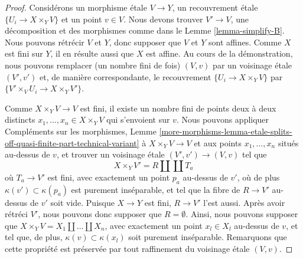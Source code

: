 \begin{proof}
Consid\'erons un morphisme \'etale $V \to Y$, un recouvrement \'etale $\{U_i \to X \times_Y V\}$ et
un point $v \in V$. Nous devons trouver $V' \to V$, une d\'ecomposition et des morphismes comme dans le
Lemme \ref{lemma-simplify-B}.
Nous pouvons r\'etr\'ecir $V$ et $Y$, donc supposer que $V$ et $Y$ sont affines.
Comme $X$ est fini sur $Y$, il en r\'esulte aussi que $X$ est affine.
Au cours de la d\'emonstration, nous pouvons remplacer (un nombre fini de fois) $(V, v)$ par un
voisinage \'etale $(V', v')$ et, de mani\`ere correspondante, le recouvrement
$\{U_i \to X \times_Y V\}$ par $\{V' \times_V U_i \to X \times_Y V'\}$.

\medskip\noindent
Comme $X \times_Y V \to V$ est fini, il existe un nombre fini de
points deux \`a deux distincts $x_1, \ldots, x_n \in X \times_Y V$
qui s'envoient sur $v$. Nous pouvons appliquer
Compléments sur les morphismes, Lemme
\ref{more-morphisms-lemma-etale-splits-off-quasi-finite-part-technical-variant}
\`a $X \times_Y V \to V$ et aux points $x_1, \ldots, x_n$ situ\'es au-dessus de
$v$, et trouver un voisinage \'etale $(V', v') \to (V, v)$
tel que
$$
X \times_Y V' = R \amalg \coprod T_a
$$
o\`u $T_a \to V'$ est fini, avec exactement un point $p_a$ au-dessus de $v'$,
o\`u de plus $\kappa(v') \subset \kappa(p_a)$ est purement ins\'eparable, et
tel que la fibre de $R \to V'$ au-dessus de $v'$ soit vide.
Puisque $X \to Y$ est fini, $R \to V'$ l'est aussi. Apr\`es avoir
r\'etr\'eci $V'$, nous pouvons donc supposer que $R = \emptyset$. Ainsi, nous pouvons
supposer que $X \times_Y V = X_1 \amalg \ldots \amalg X_n$, avec
exactement un point $x_l \in X_l$ au-dessus de $v$, et tel que, de plus,
$\kappa(v) \subset \kappa(x_l)$ soit purement ins\'eparable. Remarquons que cette
propri\'et\'e est pr\'eserv\'ee par tout raffinement du voisinage \'etale
$(V, v)$.


\end{proof}

